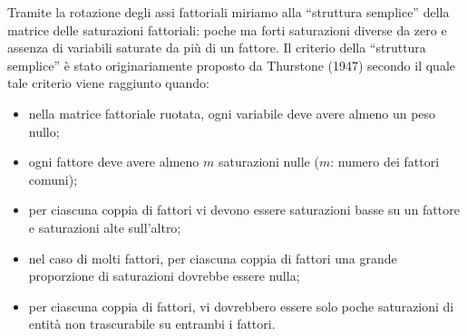 Tramite la rotazione degli assi fattoriali miriamo alla ``struttura semplice'' della matrice delle saturazioni fattoriali: poche ma forti saturazioni diverse da zero e assenza di variabili saturate da più di un fattore. Il criterio della ``struttura semplice'' è stato originariamente proposto da Thurstone (1947) secondo il quale tale criterio viene raggiunto quando:
\begin{itemize}
\item nella matrice fattoriale ruotata, ogni variabile deve avere almeno un peso nullo;
\item ogni fattore deve avere almeno $m$ saturazioni nulle ($m$: numero dei fattori comuni);
\item per ciascuna coppia di fattori vi devono essere saturazioni basse su un fattore e saturazioni alte sull'altro;
\item nel caso di molti fattori, per ciascuna coppia di fattori una grande proporzione di saturazioni dovrebbe essere nulla;
\item  per ciascuna coppia di fattori, vi dovrebbero essere solo poche saturazioni di entità non trascurabile su entrambi i fattori.
\end{itemize}

%

